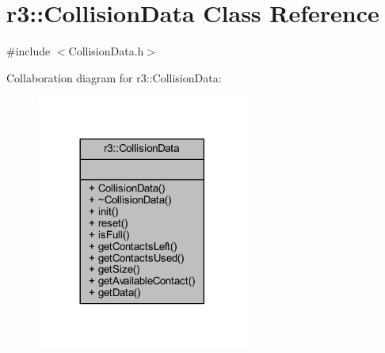 \hypertarget{classr3_1_1_collision_data}{}\section{r3\+:\+:Collision\+Data Class Reference}
\label{classr3_1_1_collision_data}


{\ttfamily \#include $<$Collision\+Data.\+h$>$}



Collaboration diagram for r3\+:\+:Collision\+Data\+:\nopagebreak
\begin{figure}[H]
\begin{center}
\leavevmode
\includegraphics[width=197pt]{classr3_1_1_collision_data__coll__graph}
\end{center}
\end{figure}
